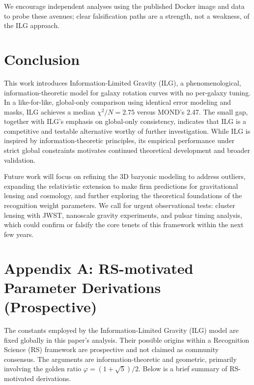 \documentclass[12pt,a4paper]{article}
\begin{document}
We encourage independent analyses using the published Docker image and data to probe these avenues; clear falsification paths are a strength, not a weakness, of the ILG approach.

\section{Conclusion}

This work introduces Information-Limited Gravity (ILG), a phenomenological, information-theoretic model for galaxy rotation curves with no per-galaxy tuning. In a like-for-like, global-only comparison using identical error modeling and masks, ILG achieves a median $\chi^2/N = 2.75$ versus MOND's 2.47. The small gap, together with ILG's emphasis on global-only consistency, indicates that ILG is a competitive and testable alternative worthy of further investigation.
While ILG is inspired by information-theoretic principles, its empirical performance under strict global constraints motivates continued theoretical development and broader validation.

Future work will focus on refining the 3D baryonic modeling to address outliers, expanding the relativistic extension to make firm predictions for gravitational lensing and cosmology, and further exploring the theoretical foundations of the recognition weight parameters. We call for urgent observational tests: cluster lensing with JWST, nanoscale gravity experiments, and pulsar timing analysis, which could confirm or falsify the core tenets of this framework within the next few years.

\appendix
\section*{Appendix A: RS-motivated Parameter Derivations (Prospective)}

The constants employed by the Information-Limited Gravity (ILG) model are fixed globally in this paper's analysis. Their possible origins within a Recognition Science (RS) framework are prospective and not claimed as community consensus. The arguments are information-theoretic and geometric, primarily involving the golden ratio $\varphi = (1+\sqrt{5})/2$. Below is a brief summary of RS-motivated derivations.
\end{document}
